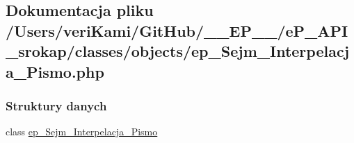 \hypertarget{ep___sejm___interpelacja___pismo_8php}{\subsection{Dokumentacja pliku /\-Users/veri\-Kami/\-Git\-Hub/\-\_\-\-\_\-\-E\-P\-\_\-\-\_\-/e\-P\-\_\-\-A\-P\-I\-\_\-srokap/classes/objects/ep\-\_\-\-Sejm\-\_\-\-Interpelacja\-\_\-\-Pismo.php}
\label{ep___sejm___interpelacja___pismo_8php}
}
\subsubsection*{Struktury danych}
\begin{DoxyCompactItemize}
\item 
class \hyperlink{classep___sejm___interpelacja___pismo}{ep\-\_\-\-Sejm\-\_\-\-Interpelacja\-\_\-\-Pismo}
\end{DoxyCompactItemize}
